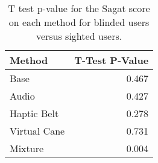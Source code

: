 
\begin{table}[!htb]
\centering
\caption{T test p-value for the Sagat score on each method for blinded users versus sighted users.}
\label{tab:ttest_sagat_score}
\begin{tabular}{lr}
\toprule
      Method &  T-Test P-Value \\
\midrule
        Base &           0.467 \\
       Audio &           0.427 \\
 Haptic Belt &           0.278 \\
Virtual Cane &           0.731 \\
     Mixture &           0.004 \\
\bottomrule
\end{tabular}
\end{table}

